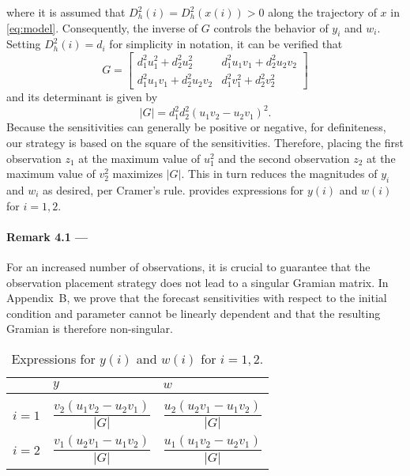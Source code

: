 \documentclass{article}
\begin{document}
where it is assumed that $D_h^2(i) = D_h^2(x(i)) > 0$ along the trajectory of $x$ in \cref{eq:model}. Consequently, the inverse of $G$ controls the behavior of $y_i$ and $w_i$. Setting $D_h^2(i) = d_i$ for simplicity in notation, it can be verified that
\begin{equation}
    G = \begin{bmatrix} 
        d_1^2 u_1^2 + d_2^2 u_2^2    &   d_1^2 u_1v_1 + d_2^2 u_2v_2 \\
        d_1^2 u_1v_1 + d_2^2 u_2v_2  &   d_1^2 v_1^2 + d_2^2 v_2^2
        \end{bmatrix} \label{eq:gramian2}
\end{equation}
and its determinant is given by
\begin{equation}
    |G| = d_1^2 d_2^2 (u_1v_2 - u_2 v_1)^2. \label{eq:det}
\end{equation}
Because the sensitivities can generally be positive or negative, for definiteness, our strategy is based on the square of the sensitivities. Therefore, placing the first observation $z_1$ at the maximum value of $u_1^2$ and the second observation $z_2$ at the maximum value of $v_2^2$ maximizes $|G|$. This in turn reduces the magnitudes of $y_i$ and $w_i$ as desired, per Cramer’s rule.  provides expressions for $y(i)$ and $w(i)$ for $i = 1,2$.

\textcolor{rev}{\paragraph{Remark 4.1 ---} For an increased number of observations, it is crucial to guarantee that the observation placement strategy does not lead to a singular Gramian matrix. In Appendix~B, we prove that the forecast sensitivities with respect to the initial condition and parameter cannot be linearly dependent and that the resulting Gramian is therefore non-singular.}

\begin{table*}[htbp!]
\caption{Expressions for $y(i)$ and $w(i)$ for $i = 1,2$.} \vspace{5pt}
\centering
\begin{tabular}{P{0.05\textwidth} P{0.25\textwidth} P{0.25\textwidth}   }  
\hline
& $y$ & $w$ \smallskip \\
\hline \smallskip\\
$i=1$ & $\dfrac{v_2(u_1v_2-u_2v_1)}{|G|}$ & $\dfrac{u_2(u_2v_1-u_1v_2)}{|G|}$  \medskip \vspace{10pt} \\
$i=2$ & $\dfrac{v_1(u_2v_1-u_1v_2)}{|G|}$ & $\dfrac{u_1(u_1v_2-u_2v_1)}{|G|}$ \medskip \\
\hline
\end{tabular}
\label{table:yw}
\end{table*}
\end{document}
